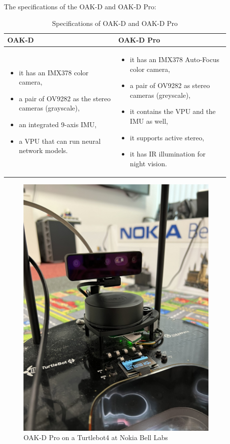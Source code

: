 The specifications of the OAK-D and OAK-D Pro:
\begin{table}[h!]
\centering
\begin{tabular}{|>{\raggedright\arraybackslash}p{0.45\linewidth}|>{\raggedright\arraybackslash}p{0.45\linewidth}|}
\hline
\textbf{OAK-D} & \textbf{OAK-D Pro} \\
\hline
\begin{itemize}
    \setlength\itemsep{0em}
    \item it has an IMX378 color camera,
    \item a pair of OV9282 as the stereo cameras (grayscale),
    \item an integrated 9-axis IMU,
    \item a VPU that can run neural network models.
\end{itemize} &
\begin{itemize}
    \setlength\itemsep{0em}
    \item it has an IMX378 Auto-Focus color camera,
    \item a pair of OV9282 as stereo cameras (greyscale),
    \item it contains the VPU and the IMU as well,
    \item it supports active stereo,
    \item it has IR illumination for night vision.
\end{itemize} \\
\hline
\end{tabular}
\caption{Specifications of OAK-D and OAK-D Pro}
\end{table}


\begin{figure}[htbp]
    \centering
    \includegraphics[width=100mm, keepaspectratio]{figures/oak_d_pro_nokia.JPEG}
    \caption{OAK-D Pro on a Turtlebot4 at Nokia Bell Labs}
    \label{fig:oak_d_pro_nokia}
\end{figure}

